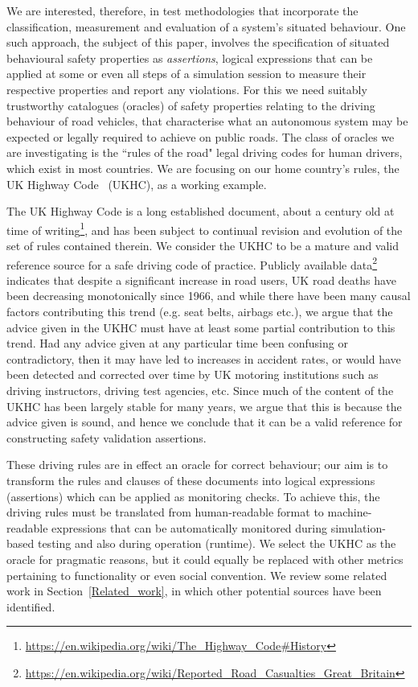 We are interested, therefore, in test methodologies that incorporate the classification, measurement and evaluation of a system's situated behaviour. One such approach, the subject of this paper, involves the specification of situated behavioural safety properties as \emph{assertions}, logical expressions that can be applied at some or even all steps of a simulation session to measure their respective properties and report any violations. For this we need suitably trustworthy catalogues (oracles) of safety properties relating to the driving behaviour of road vehicles, that characterise what an autonomous system may be expected or legally required to achieve on public roads. The class of oracles we are investigating is the ``rules of the road" legal driving codes for human drivers, which exist in most countries. We are focusing on our home country's rules, the UK Highway Code~\cite{highwayCode} (UKHC), as a working example.

The UK Highway Code is a long established document, about a century old at time of writing\footnote{\url{https://en.wikipedia.org/wiki/The\_Highway\_Code\#History}}, and has been subject to continual revision and evolution of the set of rules contained therein. We consider the UKHC to be a mature and valid reference source for a safe driving code of practice. 
Publicly available data\footnote{\url{https://en.wikipedia.org/wiki/Reported\_Road\_Casualties\_Great\_Britain} } indicates that despite a significant increase in road users, UK road deaths have been decreasing monotonically since 1966, and while there have been many causal factors contributing this trend (e.g. seat belts, airbags etc.), we argue that the advice given in the UKHC must have at least some partial contribution to this trend. Had any advice given at any particular time been confusing or contradictory, then it may have led to increases in accident rates, or would have been detected and corrected over time by UK motoring institutions such as driving instructors, driving test agencies, etc. Since much of the content of the UKHC has been largely stable for many years, we argue that this is because the advice given is sound, and hence we conclude that it can be a valid reference for constructing safety validation assertions.

These driving rules are in effect an oracle for correct behaviour; our aim is to transform the rules and clauses of these documents into logical expressions (assertions) which can be applied as monitoring checks. To achieve this, the driving rules must be translated from human-readable format to machine-readable expressions that can be automatically monitored during simulation-based testing and also during operation (runtime). We select the UKHC as the oracle for pragmatic reasons, but it could equally be replaced with other metrics pertaining to functionality or even social convention. We review some related work in Section~\ref{Related_work}, in which other potential sources have been identified.

